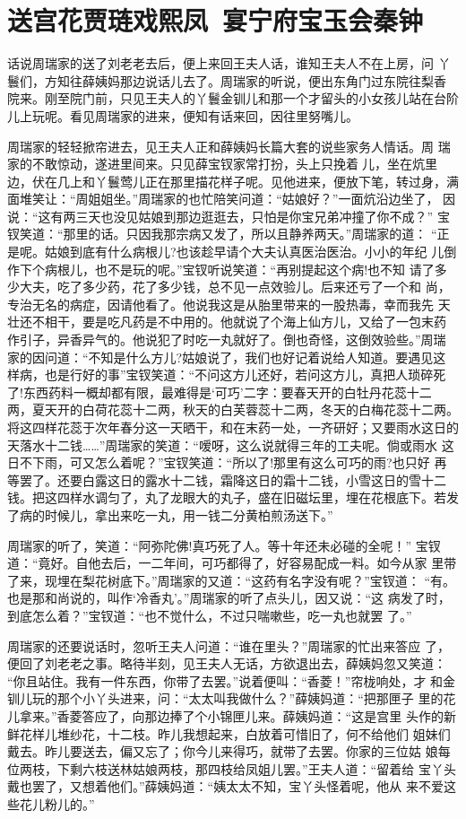 \chapter{送宫花贾琏戏熙凤~宴宁府宝玉会秦钟}

话说周瑞家的送了刘老老去后，便上来回王夫人话，谁知王夫人不在上房，问
丫鬟们，方知往薛姨妈那边说话儿去了。周瑞家的听说，便出东角门过东院往梨香
院来。刚至院门前，只见王夫人的丫鬟金钏儿和那一个才留头的小女孩儿站在台阶
儿上玩呢。看见周瑞家的进来，便知有话来回，因往里努嘴儿。

周瑞家的轻轻掀帘进去，见王夫人正和薛姨妈长篇大套的说些家务人情话。周
瑞家的不敢惊动，遂进里间来。只见薛宝钗家常打扮，头上只挽着儿，坐在炕里
边，伏在几上和丫鬟莺儿正在那里描花样子呢。见他进来，便放下笔，转过身，满
面堆笑让：“周姐姐坐。”周瑞家的也忙陪笑问道：“姑娘好？”一面炕沿边坐了，
因说：“这有两三天也没见姑娘到那边逛逛去，只怕是你宝兄弟冲撞了你不成？”
宝钗笑道：“那里的话。只因我那宗病又发了，所以且静养两天。”周瑞家的道：
“正是呢。姑娘到底有什么病根儿?也该趁早请个大夫认真医治医治。小小的年纪
儿倒作下个病根儿，也不是玩的呢。”宝钗听说笑道：“再别提起这个病!也不知
请了多少大夫，吃了多少药，花了多少钱，总不见一点效验儿。后来还亏了一个和
尚，专治无名的病症，因请他看了。他说我这是从胎里带来的一股热毒，幸而我先
天壮还不相干，要是吃凡药是不中用的。他就说了个海上仙方儿，又给了一包末药
作引子，异香异气的。他说犯了时吃一丸就好了。倒也奇怪，这倒效验些。”周瑞
家的因问道：“不知是什么方儿?姑娘说了，我们也好记着说给人知道。要遇见这
样病，也是行好的事”宝钗笑道：“不问这方儿还好，若问这方儿，真把人琐碎死
了!东西药料一概却都有限，最难得是‘可巧’二字：要春天开的白牡丹花蕊十二
两，夏天开的白荷花蕊十二两，秋天的白芙蓉蕊十二两，冬天的白梅花蕊十二两。
将这四样花蕊于次年春分这一天晒干，和在末药一处，一齐研好；又要雨水这日的
天落水十二钱……”周瑞家的笑道：“嗳呀，这么说就得三年的工夫呢。倘或雨水
这日不下雨，可又怎么着呢？”宝钗笑道：“所以了!那里有这么可巧的雨?也只好
再等罢了。还要白露这日的露水十二钱，霜降这日的霜十二钱，小雪这日的雪十二
钱。把这四样水调匀了，丸了龙眼大的丸子，盛在旧磁坛里，埋在花根底下。若发
了病的时候儿，拿出来吃一丸，用一钱二分黄柏煎汤送下。”

周瑞家的听了，笑道：“阿弥陀佛!真巧死了人。等十年还未必碰的全呢！”
宝钗道：“竟好。自他去后，一二年间，可巧都得了，好容易配成一料。如今从家
里带了来，现埋在梨花树底下。”周瑞家的又道：“这药有名字没有呢？”宝钗道：
“有。也是那和尚说的，叫作‘冷香丸’。”周瑞家的听了点头儿，因又说：“这
病发了时，到底怎么着？”宝钗道：“也不觉什么，不过只喘嗽些，吃一丸也就罢
了。”

周瑞家的还要说话时，忽听王夫人问道：“谁在里头？”周瑞家的忙出来答应
了，便回了刘老老之事。略待半刻，见王夫人无话，方欲退出去，薛姨妈忽又笑道：
“你且站住。我有一件东西，你带了去罢。”说着便叫：“香菱！”帘栊响处，才
和金钏儿玩的那个小丫头进来，问：“太太叫我做什么？”薛姨妈道：“把那匣子
里的花儿拿来。”香菱答应了，向那边捧了个小锦匣儿来。薛姨妈道：“这是宫里
头作的新鲜花样儿堆纱花，十二枝。昨儿我想起来，白放着可惜旧了，何不给他们
姐妹们戴去。昨儿要送去，偏又忘了；你今儿来得巧，就带了去罢。你家的三位姑
娘每位两枝，下剩六枝送林姑娘两枝，那四枝给凤姐儿罢。”王夫人道：“留着给
宝丫头戴也罢了，又想着他们。”薛姨妈道：“姨太太不知，宝丫头怪着呢，他从
来不爱这些花儿粉儿的。”

